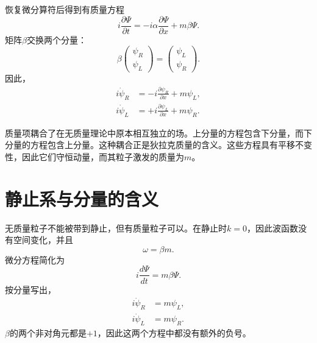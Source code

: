 恢复微分算符后得到有质量方程
\begin{equation}
i\frac{\partial\Psi}{\partial t}
=
-i\alpha\frac{\partial\Psi}{\partial x}
+m\beta\Psi.
\end{equation}
矩阵\(\beta\)交换两个分量：
\begin{equation}
\beta
\begin{pmatrix}
\psi_R\\
\psi_L
\end{pmatrix}
=
\begin{pmatrix}
\psi_L\\
\psi_R
\end{pmatrix}.
\end{equation}
因此，
\begin{align}
i\dot{\psi}_R
&=-i\frac{\partial\psi_R}{\partial x}+m\psi_L,\\
i\dot{\psi}_L
&=+i\frac{\partial\psi_L}{\partial x}+m\psi_R.
\end{align}

质量项耦合了在无质量理论中原本相互独立的场。上分量的方程包含下分量，而下分量的方程包含上分量。这种耦合正是狄拉克质量的含义。这些方程具有平移不变性，因此它们守恒动量，而其粒子激发的质量为\(m\)。

\begin{classroomqa}
\end{classroomqa}

\section{静止系与分量的含义}

无质量粒子不能被带到静止，但有质量粒子可以。在静止时\(k=0\)，因此波函数没有空间变化，并且
\begin{equation}
\omega=\beta m.
\end{equation}
微分方程简化为
\begin{equation}
i\frac{d\Psi}{dt}=m\beta\Psi.
\end{equation}
按分量写出，
\begin{align}
i\dot{\psi}_R&=m\psi_L,\\
i\dot{\psi}_L&=m\psi_R.
\end{align}
\(\beta\)的两个非对角元都是\(+1\)，因此这两个方程中都没有额外的负号。

